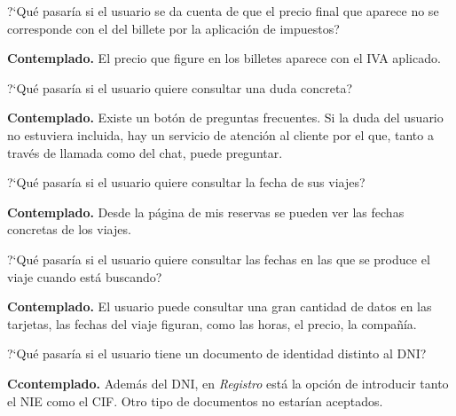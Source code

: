\begin{escenario}
    \centering
    ?`Qué pasaría si el usuario se da cuenta de que el precio final que aparece no se corresponde con el del billete por la aplicación de impuestos?

    \begin{solucion}
        \centering
        \textbf{Contemplado.} El precio que figure en los billetes aparece con el IVA aplicado.
    \end{solucion}
\end{escenario}

\begin{escenario}
    \centering
    ?`Qué pasaría si el usuario quiere consultar una duda concreta?

    \begin{solucion}
        \centering
        \textbf{Contemplado.} Existe un botón de preguntas frecuentes. Si la duda del usuario no estuviera incluida, hay un servicio de atención al cliente por el que, tanto a través de llamada como del chat, puede preguntar.
    \end{solucion}
\end{escenario}

\begin{escenario}
    \centering
    ?`Qué pasaría si el usuario quiere consultar la fecha de sus viajes?

    \begin{solucion}
        \centering
        \textbf{Contemplado.} Desde la página de mis reservas se pueden ver las fechas concretas de los viajes.
    \end{solucion}
\end{escenario}

\begin{escenario}
    \centering
    ?`Qué pasaría si el usuario quiere consultar las fechas en las que se produce el viaje cuando está buscando?

    \begin{solucion}
        \centering
        \textbf{Contemplado.} El usuario puede consultar una gran cantidad de datos en las tarjetas, las fechas del viaje figuran, como las horas, el precio, la compañía.
    \end{solucion}
\end{escenario}

\begin{escenario} %
    \centering
    ?`Qué pasaría si el usuario tiene un documento de identidad distinto al DNI?

    \begin{solucion}
        \centering
        \textbf{Ccontemplado.} Además del DNI, en \textit{Registro} está la opción de introducir tanto el NIE como el CIF. Otro tipo de documentos no estarían aceptados.
    \end{solucion}
\end{escenario}

